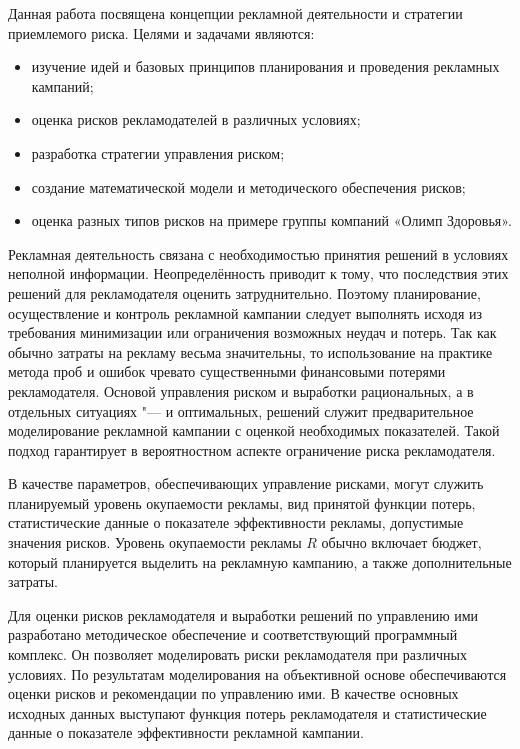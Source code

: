 
\vzmscaption



Данная работа посвящена концепции рекламной
деятельности и стратегии приемлемого риска.
Целями и задачами являются:

\begin{itemize}%
  \item
    изучение идей и базовых принципов
    планирования и проведения рекламных кампаний;
  \item
  	оценка рисков рекламодателей в
  	различных условиях;
  \item
    разработка стратегии управления риском;
  \item
    создание математической модели
  	и методического обеспечения рисков;
  \item
    оценка разных типов рисков на примере
    группы компаний «Олимп Здоровья».
\end{itemize}

{Рекламная деятельность связана с необходимостью
принятия решений в условиях неполной информации.
Неопределённость приводит к тому, что последствия
этих решений для рекламодателя оценить затруднительно.
Поэтому планирование, осуществление и контроль рекламной кампании следует
выполнять исходя из требования минимизации
или ограничения возможных неудач и потерь.
Так как обычно затраты на рекламу весьма значительны,
то использование на практике метода проб и
ошибок чревато существенными финансовыми потерями рекламодателя.
Основой управления риском и выработки рациональных,
а в отдельных ситуациях "--- и оптимальных, решений
служит предварительное моделирование рекламной кампании с
оценкой необходимых показателей. Такой подход
гарантирует в вероятностном аспекте ограничение риска рекламодателя.}


{В качестве параметров, обеспечивающих
управление рисками, могут служить планируемый
уровень окупаемости рекламы, вид принятой функции
потерь, статистические данные о показателе
эффективности рекламы, допустимые значения
рисков. Уровень окупаемости рекламы $R$ обычно
включает бюджет, который планируется выделить
на рекламную кампанию, а также дополнительные
затраты.}

{Для оценки рисков рекламодателя и выработки
решений по управлению ими разработано методическое
обеспечение и соответствующий программный
комплекс. Он позволяет моделировать риски рекламодателя
при различных условиях. По результатам моделирования
на объективной основе обеспечиваются оценки
рисков и рекомендации по управлению ими. В качестве
основных исходных данных выступают функция
потерь рекламодателя и статистические данные
о показателе эффективности рекламной кампании.}

